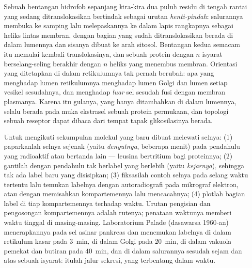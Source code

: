 \begin{proposition}\label{prop:b3:membrane-traffic:topology}
Sebuah bentangan hidrofob sepanjang kira-kira dua puluh residu di tengah
rantai yang sedang ditranslokasikan bertindak sebagai urutan
\emph{henti-pindah}: salurannya membuka ke samping lalu melepaskannya ke dalam
lapis rangkapnya sebagai heliks lintas membran, dengan bagian yang sudah
ditranslokasikan berada di dalam lumennya dan sisanya dibuat ke arah sitosol.
Bentangan kedua semacam itu memulai kembali translokasinya, dan sebuah protein
dengan $n$ isyarat berselang-seling berakhir dengan $n$ heliks yang menembus
membran. Orientasi yang ditetapkan di dalam retikulumnya tak pernah berubah:
apa yang menghadap lumen retikulumnya menghadap lumen Golgi dan lumen setiap
vesikel sesudahnya, dan menghadap \emph{luar} sel sesudah fusi dengan membran
plasmanya. Karena itu gulanya, yang hanya ditambahkan di dalam lumennya, selalu
berada pada muka ekstrasel sebuah protein permukaan, dan topologi sebuah
reseptor dapat dibaca dari tempat tapak glikosilasinya berada.
\end{proposition}

\begin{method}\label{met:b3:membrane-traffic:pulse-chase}
Untuk mengikuti sekumpulan molekul yang baru dibuat melewati selnya: (1)
paparkanlah selnya sejenak (yaitu \emph{denyutnya}, beberapa menit) pada
pendahulu yang radioaktif atau bertanda lain --- leusina bertritium bagi
proteinnya; (2) gantilah dengan pendahulu tak berlabel yang berlebih (yaitu
\emph{kejarnya}), sehingga tak ada label baru yang disisipkan; (3) fiksasilah
contoh selnya pada selang waktu tertentu lalu temukan labelnya dengan
autoradiografi pada mikrograf elektron, atau dengan memisahkan kompartemennya
lalu mencacahnya; (4) plotlah bagian label di tiap kompartemennya terhadap
waktu. Urutan pengisian dan pengosongan kompartemennya adalah rutenya;
penataan waktunya memberi waktu tinggal di masing-masing. Laboratorium Palade
(dasawarsa 1960-an) menerapkannya pada sel asinar pankreas dan menemukan
labelnya di dalam retikulum kasar pada \qty{3}{min}, di dalam Golgi pada
\qty{20}{min}, di dalam vakuola pemekat dan butiran pada \qty{40}{min}, dan di
dalam salurannya sesudah sejam dan atas sebuah isyarat: itulah jalur sekresi,
yang terbentang dalam waktu.
\end{method}

